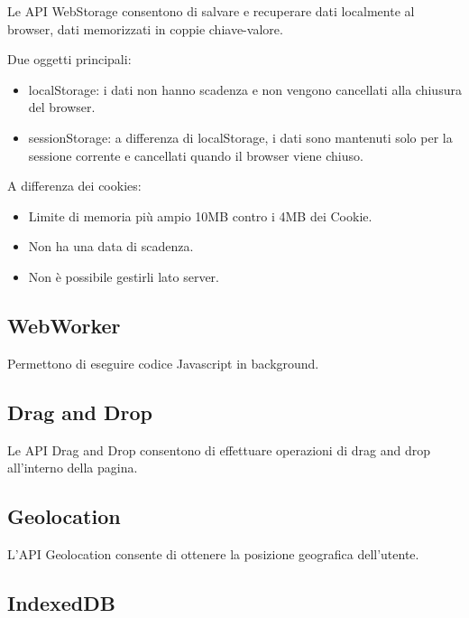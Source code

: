 \documentclass[
]{article}
\providecommand{\tightlist}{%
  \setlength{\itemsep}{0pt}\setlength{\parskip}{0pt}}
\begin{document}
{Le API WebStorage consentono di salvare e recuperare dati localmente al
browser, dati memorizzati in coppie chiave-valore.}

{Due oggetti principali:}

\begin{itemize}
\tightlist
\item
  {localStorage}{: i dati non hanno scadenza e non vengono cancellati
  alla chiusura del browser.}
\item
  {sessionStorage}{: a differenza di localStorage, i dati sono mantenuti
  solo per la sessione corrente e cancellati quando il browser viene
  chiuso. }
\end{itemize}

{}

{A differenza dei cookies: }

\begin{itemize}
\tightlist
\item
  {Limite di memoria più ampio 10MB contro i 4MB dei Cookie.}
\item
  {Non ha una data di scadenza.}
\item
  {Non è possibile gestirli lato server.}
\end{itemize}

\subsection{\texorpdfstring{{WebWorker}}{WebWorker}}\label{h.813equ539fxl}

{Permettono di eseguire codice Javascript in background.}

\subsection{\texorpdfstring{{Drag and
Drop}}{Drag and Drop}}\label{h.p8p436ir86kj}

{Le API Drag and Drop consentono di effettuare operazioni di drag and
drop all'interno della pagina.}

\subsection{\texorpdfstring{{Geolocation}}{Geolocation}}\label{h.vpfu1enj2l98}

{L'API Geolocation consente di ottenere la posizione geografica
dell'utente.}

\subsection{\texorpdfstring{{IndexedDB}}{IndexedDB}}\label{h.etene0n9zcjv}
\end{document}
